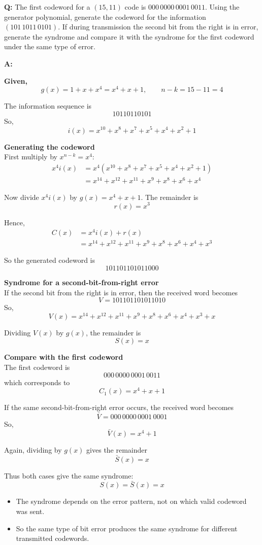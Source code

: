 \documentclass[11pt,a4paper]{book}
\newenvironment{infobox}[1][Information]{%
    \begin{tcolorbox}[
        enhanced,
        breakable,
        colback=mintgreen!10,
        colframe=mintgreen!200,
        title=#1,
        fonttitle=\bfseries,
        sharp corners,
        boxrule=0.8pt,
        left=8pt,
        right=8pt,
        top=6pt,
        bottom=6pt
    ]
}{\end{tcolorbox}}
\newcounter{qna}[chapter]
\renewcommand{\theqna}{\thechapter.\arabic{qna}}
\newenvironment{questionanswerbox}[1][Example]{%
    \refstepcounter{qna}
    \begin{tcolorbox}[
        enhanced,
        breakable,
        colback=softlavender!10,
        colframe=softlavender!200,
        title={#1~\theqna},
        fonttitle=\bfseries,
        coltitle=white,
        colbacktitle=softlavender!200,
        sharp corners,
        boxrule=1pt,
        left=8pt,
        right=8pt,
        top=6pt,
        bottom=6pt
    ]
}{\end{tcolorbox}}
\begin{document}
\begin{questionanswerbox}[Cyclic Encoding and Syndrome Comparison Example]
\textbf{Q:} The first codeword for a \((15,11)\) code is \(000\,0000\,0001\,0011\). Using the generator polynomial, generate the codeword for the information \((101\,1011\,0101)\). If during transmission the second bit from the right is in error, generate the syndrome and compare it with the syndrome for the first codeword under the same type of error.

\textbf{A:}

\textbf{Given,}
\[
g(x)=1+x+x^4=x^4+x+1,\qquad n-k=15-11=4
\]

The information sequence is
\[
10110110101
\]
So,
\[
i(x)=x^{10}+x^8+x^7+x^5+x^4+x^2+1
\]

\textbf{Generating the codeword}\\
First multiply by \(x^{n-k}=x^4\):
\begin{align*}
x^4i(x)&=x^4(x^{10}+x^8+x^7+x^5+x^4+x^2+1)\\
       &=x^{14}+x^{12}+x^{11}+x^9+x^8+x^6+x^4
\end{align*}

Now divide \(x^4 i(x)\) by \(g(x)=x^4+x+1\). The remainder is
\[
r(x)=x^3
\]

Hence,
\begin{align*}
C(x)&=x^4i(x)+r(x)\\
    &=x^{14}+x^{12}+x^{11}+x^9+x^8+x^6+x^4+x^3
\end{align*}

So the generated codeword is
\[
101101101011000
\]

\textbf{Syndrome for a second-bit-from-right error}\\
If the second bit from the right is in error, then the received word becomes
\[
V=101101101011010
\]
So,
\[
V(x)=x^{14}+x^{12}+x^{11}+x^9+x^8+x^6+x^4+x^3+x
\]

Dividing \(V(x)\) by \(g(x)\), the remainder is
\[
S(x)=x
\]

\textbf{Compare with the first codeword}\\
The first codeword is
\[
000\,0000\,0001\,0011
\]
which corresponds to
\[
C_1(x)=x^4+x+1
\]

If the same second-bit-from-right error occurs, the received word becomes
\[
\bar V=000\,0000\,0001\,0001
\]
So,
\[
\bar V(x)=x^4+1
\]

Again, dividing by \(g(x)\) gives the remainder
\[
\bar S(x)=x
\]

Thus both cases give the same syndrome:
\[
S(x)=\bar S(x)=x
\]

\begin{infobox}[What This Means]
\begin{itemize}
    \item The syndrome depends on the error pattern, not on which valid codeword was sent.
    \item So the same type of bit error produces the same syndrome for different transmitted codewords.
\end{itemize}
\end{infobox}
\end{questionanswerbox}
\end{document}
